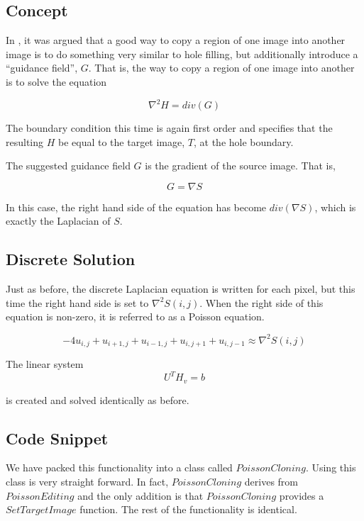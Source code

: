\documentclass{InsightArticle}
\begin{document}
\subsection{Concept}

In \cite{PoissonImageEditing}, it was argued that a good way to copy a region of one image into another image is to do something very similar to hole filling, but additionally introduce a ``guidance field'', $G$. That is, the way to copy a region of one image into another is to solve the equation

\begin{equation}
\nabla^2 H = div(G)
\end{equation}

The boundary condition this time is again first order and specifies that the resulting $H$ be equal to the target image, $T$, at the hole boundary.

The suggested guidance field $G$ is the gradient of the source image. That is,

\begin{equation}
G = \nabla S
\end{equation}

In this case, the right hand side of the equation has become $div(\nabla S)$, which is exactly the Laplacian of $S$.

\subsection{Discrete Solution}
Just as before, the discrete Laplacian equation is written for each pixel, but this time the right hand side is set to $\nabla^2 S(i,j)$. When the right side of this equation is non-zero, it is referred to as a Poisson equation.

\begin{equation}
\label{eqn:DiscretePoisson}
-4 u_{i,j} + u_{i+1,j} + u_{i-1,j} + u_{i,j+1} + u_{i,j-1} \approx \nabla^2 S(i,j)
\end{equation}

The linear system 
\begin{equation}
 U^T H_v = b
\end{equation}

is created and solved identically as before.

\subsection{Code Snippet}
We have packed this functionality into a class called $PoissonCloning$. Using this class is very straight forward. In fact, $PoissonCloning$ derives from $PoissonEditing$ and the only addition is that $PoissonCloning$ provides a $SetTargetImage$ function. The rest of the functionality is identical.
\end{document}
